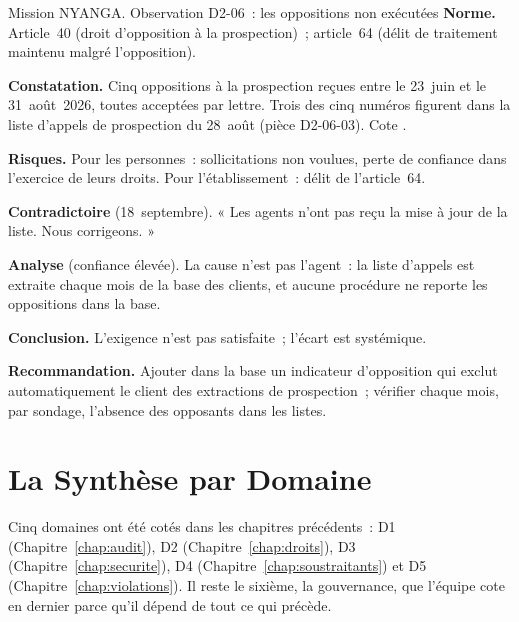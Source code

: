 \begin{boxscenario}{Mission NYANGA. Observation D2-06~: les oppositions non exécutées}
\textbf{Norme.} Article~40 (droit d'opposition à la prospection)~;
article~64 (délit de traitement maintenu malgré l'opposition).

\textbf{Constatation.} Cinq oppositions à la prospection reçues entre le
23~juin et le 31~août~2026, toutes acceptées par lettre. Trois des cinq
numéros figurent dans la liste d'appels de prospection du 28~août (pièce
D2-06-03). Cote \NON{}.

\textbf{Risques.} Pour les personnes~: sollicitations non voulues, perte de
confiance dans l'exercice de leurs droits. Pour l'établissement~: délit de
l'article~64.

\textbf{Contradictoire} (18~septembre). « Les agents n'ont pas reçu la mise
à jour de la liste. Nous corrigeons. »

\textbf{Analyse} (confiance élevée). La cause n'est pas l'agent~: la liste
d'appels est extraite chaque mois de la base des clients, et aucune
procédure ne reporte les oppositions dans la base.

\textbf{Conclusion.} L'exigence n'est pas satisfaite~; l'écart est
systémique.

\textbf{Recommandation.} Ajouter dans la base un indicateur d'opposition
qui exclut automatiquement le client des extractions de prospection~;
vérifier chaque mois, par sondage, l'absence des opposants dans les listes.
\end{boxscenario}

\section{La Synthèse par Domaine}
\label{sec:c13-synthese}

Cinq domaines ont été cotés dans les chapitres précédents~: D1
(Chapitre~\ref{chap:audit}), D2 (Chapitre~\ref{chap:droits}), D3
(Chapitre~\ref{chap:securite}), D4 (Chapitre~\ref{chap:soustraitants}) et D5
(Chapitre~\ref{chap:violations}). Il reste le sixième, la gouvernance, que
l'équipe cote en dernier parce qu'il dépend de tout ce qui précède.

